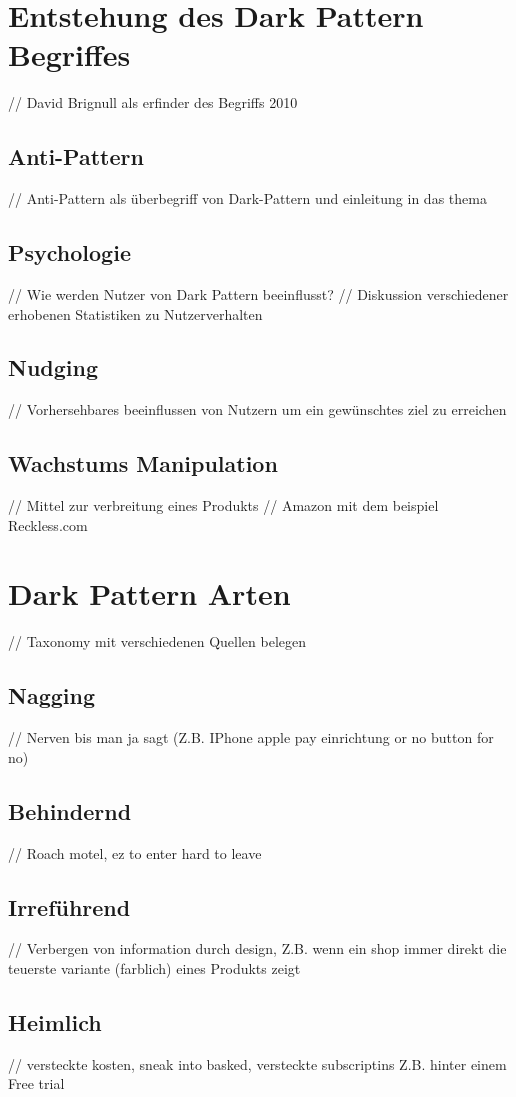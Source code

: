 \documentclass[conference,compsoc,final,a4paper]{IEEEtran}
\begin{document}
\section{Entstehung des Dark Pattern Begriffes}
// David Brignull als erfinder des Begriffs 2010
\subsection{Anti-Pattern}
// Anti-Pattern als überbegriff von Dark-Pattern und einleitung in das thema
\subsection{Psychologie}
// Wie werden Nutzer von Dark Pattern beeinflusst?
// Diskussion verschiedener erhobenen Statistiken zu Nutzerverhalten
\subsection{Nudging}
// Vorhersehbares beeinflussen von Nutzern um ein gewünschtes ziel zu erreichen
\subsection{Wachstums Manipulation}
// Mittel zur verbreitung eines Produkts
// Amazon mit dem beispiel Reckless.com

\section{Dark Pattern Arten}
// Taxonomy mit verschiedenen Quellen belegen
\subsection{Nagging}
// Nerven bis man ja sagt (Z.B. IPhone apple pay einrichtung or no button for no)
\subsection{Behindernd}
// Roach motel, ez to enter hard to leave
\subsection{Irreführend}
// Verbergen von information durch design, Z.B. wenn ein shop immer direkt die teuerste variante (farblich) eines Produkts zeigt
\subsection{Heimlich}
// versteckte kosten, sneak into basked, versteckte subscriptins Z.B. hinter einem Free trial
\end{document}
